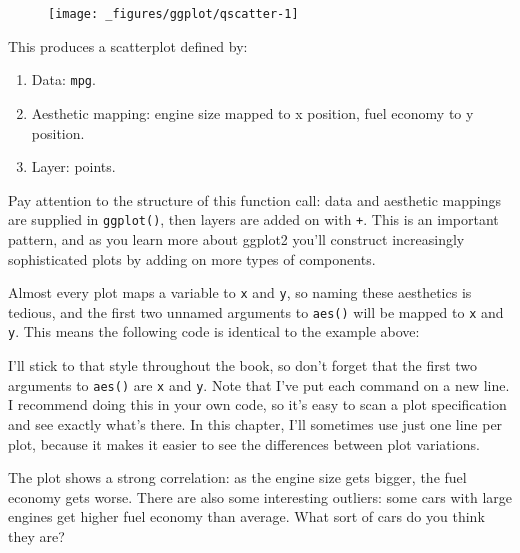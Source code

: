 \begin{figure}[H]
  \centering
  \texttt{[image: \_figures/ggplot/qscatter-1]}
\end{figure}

This produces a scatterplot defined by:

\begin{enumerate}
\def\labelenumi{\arabic{enumi}.}
\tightlist
\item
  Data: \texttt{mpg}.
\item
  Aesthetic mapping: engine size mapped to x position, fuel economy to y
  position.
\item
  Layer: points.
\end{enumerate}

Pay attention to the structure of this function call: data and aesthetic
mappings are supplied in \texttt{ggplot()}, then layers are added on
with \texttt{+}. This is an important pattern, and as you learn more
about ggplot2 you'll construct increasingly sophisticated plots by
adding on more types of components.

Almost every plot maps a variable to \texttt{x} and \texttt{y}, so
naming these aesthetics is tedious, and the first two unnamed arguments
to \texttt{aes()} will be mapped to \texttt{x} and \texttt{y}. This
means the following code is identical to the example above:

\begin{Shaded}
\begin{Highlighting}[]
\StringTok{  }\NormalTok{()}
\end{Highlighting}
\end{Shaded}

I'll stick to that style throughout the book, so don't forget that the
first two arguments to \texttt{aes()} are \texttt{x} and \texttt{y}.
Note that I've put each command on a new line. I recommend doing this in
your own code, so it's easy to scan a plot specification and see exactly
what's there. In this chapter, I'll sometimes use just one line per
plot, because it makes it easier to see the differences between plot
variations.

The plot shows a strong correlation: as the engine size gets bigger, the
fuel economy gets worse. There are also some interesting outliers: some
cars with large engines get higher fuel economy than average. What sort
of cars do you think they are?

